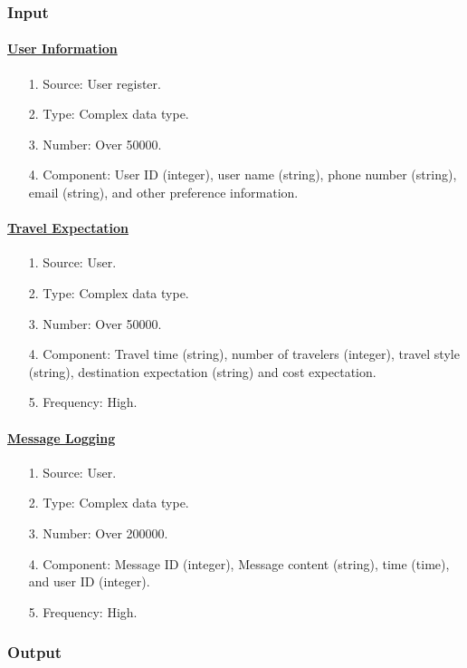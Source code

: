 \documentclass[10pt]{article}
\begin{document}
\subsubsection{Input}
\paragraph{\underline{User Information}}
\begin{itemize}
  \item[1.] Source: User register.
  \item[2.] Type: Complex data type.
  \item[3.] Number: Over 50000.
  \item[4.] Component: User ID (integer), user name (string), phone number (string), email (string), and other preference information.
\end{itemize}

\paragraph{\underline{Travel Expectation}}
\begin{itemize}
  \item[1.] Source: User.
  \item[2.] Type: Complex data type.
  \item[3.] Number: Over 50000.
  \item[4.] Component: Travel time (string), number of travelers (integer), travel style (string), destination expectation (string) and cost expectation.
  \item[5.] Frequency: High. 
\end{itemize}

\paragraph{\underline{Message Logging}}
\begin{itemize}
  \item[1.] Source: User.
  \item[2.] Type: Complex data type.
  \item[3.] Number: Over 200000.
  \item[4.] Component: Message ID (integer), Message content (string), time (time), and user ID (integer).
  \item[5.] Frequency: High.   
\end{itemize}

\subsubsection{Output}
\end{document}

